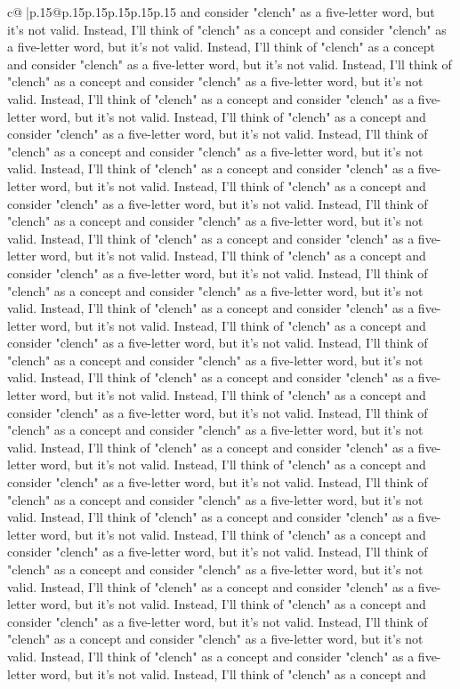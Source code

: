 \documentclass{article}
\begin{document}
{\begin{supertabular}{c@{$\;$}|p{.15\linewidth}@{}p{.15\linewidth}p{.15\linewidth}p{.15\linewidth}p{.15\linewidth}p{.15\linewidth}}
{{{and consider "clench" as a five-letter word, but it's not valid. Instead, I'll think of "clench" as a concept and consider "clench" as a five-letter word, but it's not valid. Instead, I'll think of "clench" as a concept and consider "clench" as a five-letter word, but it's not valid. Instead, I'll think of "clench" as a concept and consider "clench" as a five-letter word, but it's not valid. Instead, I'll think of "clench" as a concept and consider "clench" as a five-letter word, but it's not valid. Instead, I'll think of "clench" as a concept and consider "clench" as a five-letter word, but it's not valid. Instead, I'll think of "clench" as a concept and consider "clench" as a five-letter word, but it's not valid. Instead, I'll think of "clench" as a concept and consider "clench" as a five-letter word, but it's not valid. Instead, I'll think of "clench" as a concept and consider "clench" as a five-letter word, but it's not valid. Instead, I'll think of "clench" as a concept and consider "clench" as a five-letter word, but it's not valid. Instead, I'll think of "clench" as a concept and consider "clench" as a five-letter word, but it's not valid. Instead, I'll think of "clench" as a concept and consider "clench" as a five-letter word, but it's not valid. Instead, I'll think of "clench" as a concept and consider "clench" as a five-letter word, but it's not valid. Instead, I'll think of "clench" as a concept and consider "clench" as a five-letter word, but it's not valid. Instead, I'll think of "clench" as a concept and consider "clench" as a five-letter word, but it's not valid. Instead, I'll think of "clench" as a concept and consider "clench" as a five-letter word, but it's not valid. Instead, I'll think of "clench" as a concept and consider "clench" as a five-letter word, but it's not valid. Instead, I'll think of "clench" as a concept and consider "clench" as a five-letter word, but it's not valid. Instead, I'll think of "clench" as a concept and consider "clench" as a five-letter word, but it's not valid. Instead, I'll think of "clench" as a concept and consider "clench" as a five-letter word, but it's not valid. Instead, I'll think of "clench" as a concept and consider "clench" as a five-letter word, but it's not valid. Instead, I'll think of "clench" as a concept and consider "clench" as a five-letter word, but it's not valid. Instead, I'll think of "clench" as a concept and consider "clench" as a five-letter word, but it's not valid. Instead, I'll think of "clench" as a concept and consider "clench" as a five-letter word, but it's not valid. Instead, I'll think of "clench" as a concept and consider "clench" as a five-letter word, but it's not valid. Instead, I'll think of "clench" as a concept and consider "clench" as a five-letter word, but it's not valid. Instead, I'll think of "clench" as a concept and consider "clench" as a five-letter word, but it's not valid. Instead, I'll think of "clench" as a concept and consider "clench" as a five-letter word, but it's not valid. Instead, I'll think of "clench" as a concept and consider "clench" as a five-letter word, but it's not valid. Instead, I'll think of "clench" as a concept and }}}
\end{supertabular}}
\end{document}
